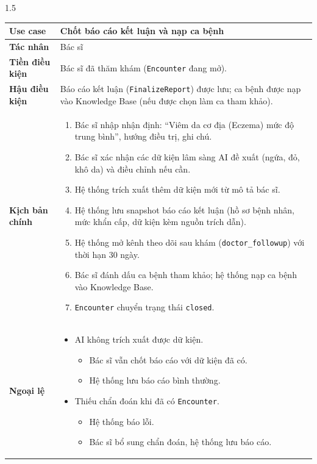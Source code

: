 \begin{spacing}{1.5}
\renewcommand{\arraystretch}{1.15}
\begin{longtable}{|>{\raggedright\arraybackslash}p{}|>{\raggedright\arraybackslash}p{}|}
\hline
\textbf{Use case} & Chốt báo cáo kết luận và nạp ca bệnh \\ \hline
\textbf{Tác nhân} & Bác sĩ \\ \hline
\textbf{Tiền điều kiện} & Bác sĩ đã thăm khám (\texttt{Encounter} đang mở). \\ \hline
\textbf{Hậu điều kiện} & Báo cáo kết luận (\texttt{FinalizeReport}) được lưu; ca bệnh được nạp vào Knowledge Base (nếu được chọn làm ca tham khảo). \\ \hline
\textbf{Kịch bản chính} &
\begin{enumerate}[nosep,leftmargin=*]
  \item Bác sĩ nhập nhận định: ``Viêm da cơ địa (Eczema) mức độ trung bình'', hướng điều trị, ghi chú.
  \item Bác sĩ xác nhận các dữ kiện lâm sàng AI đề xuất (ngứa, đỏ, khô da) và điều chỉnh nếu cần.
  \item Hệ thống trích xuất thêm dữ kiện mới từ mô tả bác sĩ.
  \item Hệ thống lưu snapshot báo cáo kết luận (hồ sơ bệnh nhân, mức khẩn cấp, dữ kiện kèm nguồn trích dẫn).
  \item Hệ thống mở kênh theo dõi sau khám (\texttt{doctor\_followup}) với thời hạn 30 ngày.
  \item Bác sĩ đánh dấu ca bệnh tham khảo; hệ thống nạp ca bệnh vào Knowledge Base.
  \item \texttt{Encounter} chuyển trạng thái \texttt{closed}.
\end{enumerate} \\ \hline
\textbf{Ngoại lệ} &
\begin{itemize}[nosep,leftmargin=2.6em,labelwidth=2em,labelsep=0.5em,align=left]
  \item[3.] AI không trích xuất được dữ kiện.
  \begin{itemize}[nosep,leftmargin=3em,labelwidth=2.4em,labelsep=0.4em,align=left]
    \item[3.1] Bác sĩ vẫn chốt báo cáo với dữ kiện đã có.
    \item[3.2] Hệ thống lưu báo cáo bình thường.
  \end{itemize}
  \item[4.] Thiếu chẩn đoán khi đã có \texttt{Encounter}.
  \begin{itemize}[nosep,leftmargin=3em,labelwidth=2.4em,labelsep=0.4em,align=left]
    \item[4.1] Hệ thống báo lỗi.
    \item[4.2] Bác sĩ bổ sung chẩn đoán, hệ thống lưu báo cáo.
  \end{itemize}
\end{itemize} \\ \hline
\end{longtable}
\end{spacing}

